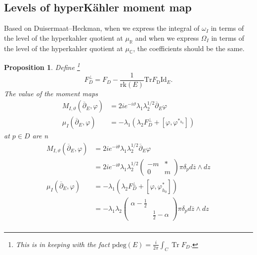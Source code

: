 \documentclass[12pt,letterpaper,reqno]{amsart}
\newtheorem{prop}[thm]{Proposition}
\theoremstyle{remark}
\theoremstyle{definition}
\numberwithin{thm}{section}
\numberwithin{equation}{section}
\numberwithin{figure}{section}
\newcommand{\R}{\ensuremath{\mathbb R}}
\newcommand{\C}{\ensuremath{\mathbb C}}
\newcommand{\delbar}{\ensuremath{\overline{\partial}}}
\newcommand{\zbar}{{\ensuremath{\overline{z}}}}
\DeclareMathOperator{\Tr}{Tr}
\begin{document}
\subsection{Levels of \texorpdfstring{hyperK\"ahler}{hyperKahler} moment map}
Based on Duisermaat--Heckman, when we express the integral of $\omega_I$ in terms of the level of the hyperkahler quotient at $\mu_\R$ and when we express $\Omega_I$ in terms of the level of the hyperkahler quotient at $\mu_\C$, the coefficients should be the same. 
\begin{prop}\label{prop:distributions}Define
\footnote{This is in keeping with the fact $\mathrm{pdeg}(E) = \frac{i}{2 \pi} \int_C \Tr F_D$.}
\[ F^\perp_D =F_D - \frac{1}{\mathrm{rk}(E)} \mathrm{Tr} F_{\mathrm{D}}  \mathrm{Id}_E.
\]
The value of the moment maps 
\begin{align*}
M_{I, \vartheta}(\delbar_E, \varphi)&= 2i e^{-i \vartheta} \lambda_1 \lambda_2^{1/2} \delbar_E \varphi\\
\mu_I(\delbar_E, \varphi) &= -\lambda_1 \left(\lambda_2 F^\perp_D + [\varphi, \varphi^{*_{h_0}}]   \right)
\end{align*}
at $p \in D$ are n
\begin{align*}
M_{I, \vartheta}(\delbar_E, \varphi) &= 2 i e^{-i \theta} \lambda_1 \lambda_2^{1/2} \delbar_E \varphi \\
&=  2 i e^{-i \theta} \lambda_1 \lambda_2^{1/2} \begin{pmatrix} -m& * \\ 0 & m \end{pmatrix} \pi \delta_p d \zbar \wedge d z\\
\mu_I(\delbar_E, \varphi) &=-\lambda_1 (\lambda_2 F^\perp_D  +[\varphi, \varphi^*_{h_0}])\\ \nonumber
&= -\lambda_1 \lambda_2  \begin{pmatrix} \alpha - \frac{1}{2} & \\ & \frac{1}{2}- \alpha \end{pmatrix} \pi \delta_p d \zbar \wedge d z \\
\end{align*}
\end{prop}
\end{document}
